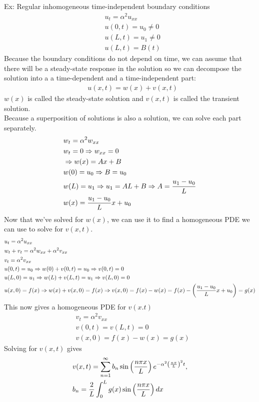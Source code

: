 \documentclass[11pt, fleqn]{article}
\begin{document}
Ex: Regular inhomogeneous time-independent boundary conditions
\begin{align*}
    &u_t=\alpha^2u_{xx}\\
    &u(0,t)=u_0\neq0\\
    &u(L,t)=u_1\neq0\\
    &u(L,t)=B(t)
\end{align*}
Because the boundary conditions do not depend on time, we can assume that there will be a steady-state response in the solution so we can decompose the solution into a a time-dependent and a time-independent part:
\begin{align*}
    &u(x,t)=w(x)+v(x,t)
\end{align*}
$w(x)$ is called the steady-state solution and $v(x,t)$ is called the transient solution.\\
Because a superposition of solutions is also a solution, we can solve each part separately.
\begin{align*}
    &w_t=\alpha^2 w_{xx}\\
    &w_t=0\Rightarrow w_{xx}=0\\
    &\Rightarrow w(x)=Ax+B\\
    &w(0)=u_0\Rightarrow B=u_0\\
    &w(L)=u_1\Rightarrow u_1=AL+B\Rightarrow A=\frac{u_1-u_0}{L}\\
    &w(x)=\frac{u_1-u_0}{L}x+u_0
\end{align*}
Now that we've solved for $w(x)$, we can use it to find a homogeneous PDE we can use to solve for $v(x,t)$.
\begin{align*}
    &u_t=\alpha^2u_{xx}\\
    &w_t+v_t=\alpha^2w_{xx}+\alpha^2v_{xx}\\
    &v_t=\alpha^2v_{xx}\\
    &u(0,t)=u_0\Rightarrow w(0)+v(0,t)=u_0\Rightarrow v(0,t)=0\\
    &u(L,0)=u_1\Rightarrow w(L)+v(L,t)=u_1\Rightarrow v(L,0)=0\\
    &u(x,0)=f(x)\Rightarrow w(x)+v(x,0)=f(x)\Rightarrow v(x,0)=f(x)-w(x)=f(x)-\left( \frac{u_1-u_0}{L}x+u_0 \right)=g(x)
\end{align*}
This now gives a homogeneous PDE for $v(x.t)$
\begin{align*}
    &v_t=\alpha^2v_{xx}\\
    &v(0,t)=v(L,t)=0\\
    &v(x,0)=f(x)-w(x)=g(x)
\end{align*}
Solving for $v(x,t)$ gives
\begin{align*}
    &v(x,t)=\sum_{n=1}^\infty b_n\sin\left( \frac{n\pi x}{L} \right)e^{-\alpha^2\left( \frac{n\pi}{L} \right)^2t},\\
    &b_n=\frac{2}{L}\int_0^L g(x)\sin\left( \frac{n\pi x}{L} \right)dx
\end{align*}
\end{document}
